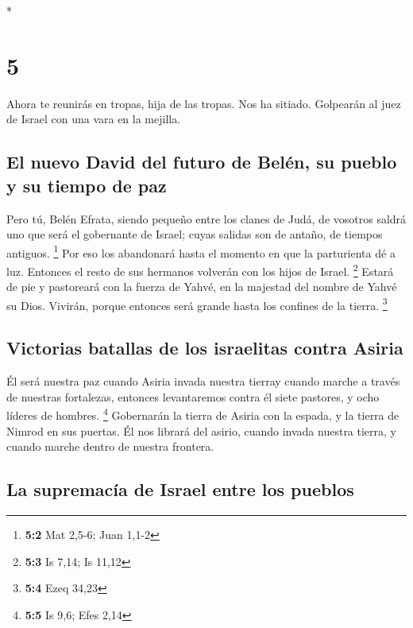 \begin{paracol}{2}
\switchcolumn[0]*

\hypertarget{section-8}{%
\section{5}\label{section-8}}

 Ahora te reunirás en tropas, hija de las tropas. Nos ha
sitiado. Golpearán al juez de Israel con una vara en la mejilla.

\hypertarget{el-nuevo-david-del-futuro-de-beluxe9n-su-pueblo-y-su-tiempo-de-paz}{%
\subsection{El nuevo David del futuro de Belén, su pueblo y su tiempo de
paz}\label{el-nuevo-david-del-futuro-de-beluxe9n-su-pueblo-y-su-tiempo-de-paz}}

 Pero tú, Belén Efrata, siendo pequeño entre los clanes de
Judá, de vosotros saldrá uno que será el gobernante de Israel; cuyas
salidas son de antaño, de tiempos antiguos. \footnote{\textbf{5:2} Mat
  2,5-6; Juan 1,1-2}  Por eso los abandonará hasta el
momento en que la parturienta dé a luz. Entonces el resto de sus
hermanos volverán con los hijos de Israel. \footnote{\textbf{5:3} Is
  7,14; Is 11,12}  Estará de pie y pastoreará con la
fuerza de Yahvé, en la majestad del nombre de Yahvé su Dios. Vivirán,
porque entonces será grande hasta los confines de la tierra. \footnote{\textbf{5:4}
  Ezeq 34,23}

\hypertarget{victorias-batallas-de-los-israelitas-contra-asiria}{%
\subsection{Victorias batallas de los israelitas contra
Asiria}\label{victorias-batallas-de-los-israelitas-contra-asiria}}

 Él será nuestra paz cuando Asiria invada nuestra tierray
cuando marche a través de nuestras fortalezas, entonces levantaremos
contra él siete pastores, y ocho líderes de hombres. \footnote{\textbf{5:5}
  Is 9,6; Efes 2,14}  Gobernarán la tierra de Asiria con
la espada, y la tierra de Nimrod en sus puertas. Él nos librará del
asirio, cuando invada nuestra tierra, y cuando marche dentro de nuestra
frontera.

\hypertarget{la-supremacuxeda-de-israel-entre-los-pueblos}{%
\subsection{La supremacía de Israel entre los
pueblos}\label{la-supremacuxeda-de-israel-entre-los-pueblos}}


\end{paracol}
